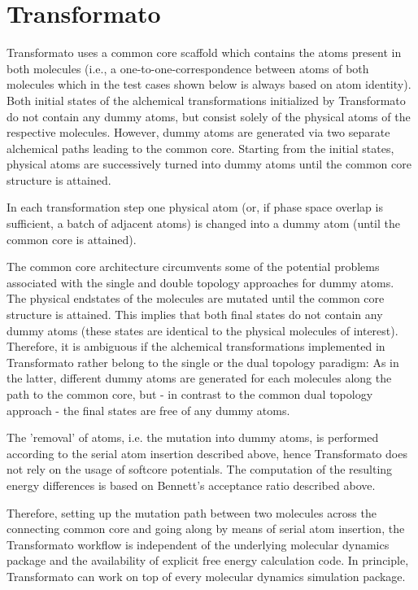 \chapter{Transformato }

Transformato uses a common core scaffold which contains the atoms
present in both molecules (i.e., a one-to-one-correspondence between
atoms of both molecules which in the test cases shown below is always
based on atom identity). Both initial states of the alchemical transformations
initialized by Transformato do not contain any dummy atoms, but consist
solely of the physical atoms of the respective molecules. However,
dummy atoms are generated via two separate alchemical paths leading
to the common core. Starting from the initial states, physical atoms
are successively turned into dummy atoms until the common core structure
is attained. 

In each transformation step one physical atom (or, if phase space
overlap is sufficient, a batch of adjacent atoms) is changed into
a dummy atom (until the common core is attained).

The common core architecture circumvents some of the potential problems
associated with the single and double topology approaches for dummy
atoms. The physical endstates of the molecules are mutated until the
common core structure is attained. This implies that both final states
do not contain any dummy atoms (these states are identical to the
physical molecules of interest). Therefore, it is ambiguous if the
alchemical transformations implemented in Transformato rather belong
to the single or the dual topology paradigm: As in the latter, different
dummy atoms are generated for each molecules along the path to the
common core, but - in contrast to the common dual topology approach
- the final states are free of any dummy atoms. 

The 'removal' of atoms, i.e. the mutation into dummy atoms, is performed
according to the serial atom insertion described above, hence Transformato
does not rely on the usage of softcore potentials. The computation
of the resulting energy differences is based on Bennett's acceptance
ratio described above.

Therefore, setting up the mutation path between two molecules across
the connecting common core and going along by means of serial atom
insertion, the Transformato workflow is independent of the underlying
molecular dynamics package and the availability of explicit free energy
calculation code. In principle, Transformato can work on top of every
molecular dynamics simulation package.

